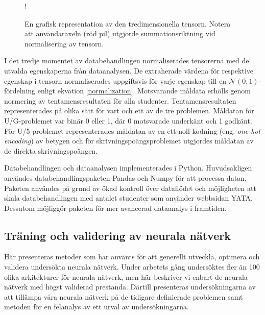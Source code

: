 \begin{wrapfigure}{r}{0.32\textwidth}
    \centering
    \resizebox {0.32\textwidth} {!} {
        
    }
    \caption{En grafisk representation av den tredimensionella tensorn. Notera att användaraxeln (röd pil) utgjorde summationsriktning vid normalisering av tensorn. }
    \label{fig:tensor}
\end{wrapfigure}


I det tredje momentet av databehandlingen normaliserades tensorerna med de utvalda egenskaperna från dataanalysen. De extraherade värdena för respektive egenskap i tensorn normaliserades uppgiftsvis för varje egenskap till en $\mathcal{N}(0,1)$-fördelning enligt ekvation \eqref{normalization}. Motsvarande måldata erhölls genom normering av tentamensresultaten för alla studenter. Tentamensresultaten representerades på olika sätt för vart och ett av de tre problemen. Måldatan för U/G-problemet var binär 0 eller 1, där 0 motsvarade underkänt och 1 godkänt. För U/5-problemet representerades måldatan av en ett-noll-kodning (eng. \emph{one-hot encoding}) av betygen och för skrivningspoängsproblemet utgjordes måldatan av de direkta skrivningspoängen.


Databehandlingen och dataanalysen implementerades i Python. Huvudsakligen användes databehandlingspaketen Pandas och Numpy för att processa datan. Paketen användes på grund av ökad kontroll över dataflödet och möjligheten att skala databehandlingen med antalet studenter som använder webbsidan YATA. Dessutom möjliggör paketen för mer avancerad dataanalys i framtiden.

\subsection{Träning och validering av neurala nätverk}
\label{sec:training_and_validation}
Här presenteras metoder som har använts för att generellt utveckla, optimera och validera undersökta neurala nätverk. Under arbetets gång undersöktes fler än 100 olika arkitekturer för neurala nätverk, men här beskriver vi enbart de neurala nätverk med högst validerad prestanda. Därtill presenteras undersökningarna av att tillämpa våra neurala nätverk på de tidigare definierade problemen samt metoden för en felanalys av ett urval av undersökningarna. 

